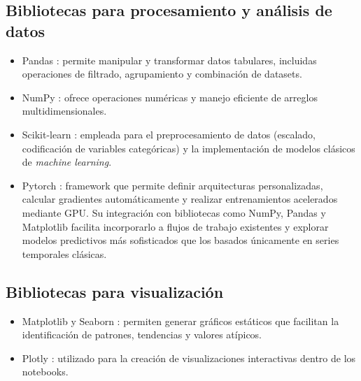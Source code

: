 \subsection{Bibliotecas para procesamiento y análisis de datos}
\begin{itemize}
	\item Pandas \citep{pandas}: permite manipular y transformar datos tabulares, incluidas operaciones de filtrado, agrupamiento y combinación de datasets.

	\item NumPy \citep{numpy}: ofrece operaciones numéricas y manejo eficiente de arreglos multidimensionales.

	\item Scikit-learn \citep{sklearn}: empleada para el preprocesamiento de datos (escalado, codificación de variables categóricas) y la implementación de modelos clásicos de \textit{machine learning}.
	
	\item Pytorch \citep{pytorch}: framework que permite definir arquitecturas personalizadas, calcular gradientes automáticamente y realizar entrenamientos acelerados mediante GPU. Su integración con bibliotecas como NumPy, Pandas y Matplotlib facilita incorporarlo a flujos de trabajo existentes y explorar modelos predictivos más sofisticados que los basados únicamente en series temporales clásicas.

\end{itemize}


\subsection{Bibliotecas para visualización}

\begin{itemize}
		\item Matplotlib \citep{matplotlib} y Seaborn \citep{seaborn}: permiten generar gráficos estáticos que facilitan la identificación de patrones, tendencias y valores atípicos.
		
		

\item Plotly \citep{plotly}: utilizado para la creación de visualizaciones interactivas dentro de los notebooks.
\end{itemize}



